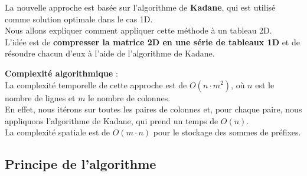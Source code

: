\documentclass[
]{article}
\begin{document}
La nouvelle approche est basée sur l'algorithme de \textbf{Kadane}, qui
est utilisé comme solution optimale dans le cas 1D.\\
Nous allons expliquer comment appliquer cette méthode à un tableau 2D.\\
L'idée est de \textbf{compresser la matrice 2D en une série de tableaux
1D} et de résoudre chacun d'eux à l'aide de l'algorithme de Kadane.

\textbf{Complexité algorithmique} :\\
La complexité temporelle de cette approche est de \(O(n \cdot m^2)\), où
\(n\) est le nombre de lignes et \(m\) le nombre de colonnes.\\
En effet, nous itérons sur toutes les paires de colonnes et, pour chaque
paire, nous appliquons l'algorithme de Kadane, qui prend un temps de
\(O(n)\).\\
La complexité spatiale est de \(O(m \cdot n)\) pour le stockage des
sommes de préfixes.

\subsection{Principe de l'algorithme}\label{principe-de-lalgorithme}
\end{document}
